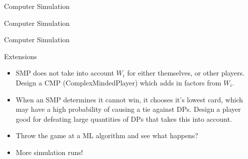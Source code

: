 \documentclass{slides}
\begin{document}
\begin{frame}{Computer Simulation}

    \begin{center}
    \end{center}
\end{frame}
\begin{frame}{Computer Simulation}

    \begin{center}
    \end{center}
\end{frame}
\begin{frame}{Computer Simulation}

    \begin{center}
    \end{center}
\end{frame}

\begin{frame}{Extensions}
    \begin{itemize}[<+->]
        \item SMP does not take into account $W_i$ for either themselves, or
            other players. Design a CMP (ComplexMindedPlayer) which adds in
            factors from $W_i$.
        \item When an SMP determines it cannot win, it chooses it's lowest
            card, which may have a high probability of causing a tie against
            DPs. Design a player good for defeating large quantities of DPs
            that takes this into account.
        \item Throw the game at a ML algorithm and see what happens?
        \item More simulation runs!
    \end{itemize}
\end{frame}

{
\begin{frame}

    \begin{center}
        \Huge
        \color{white}{Questions?}
    \end{center}

\end{frame}
}
\end{document}
